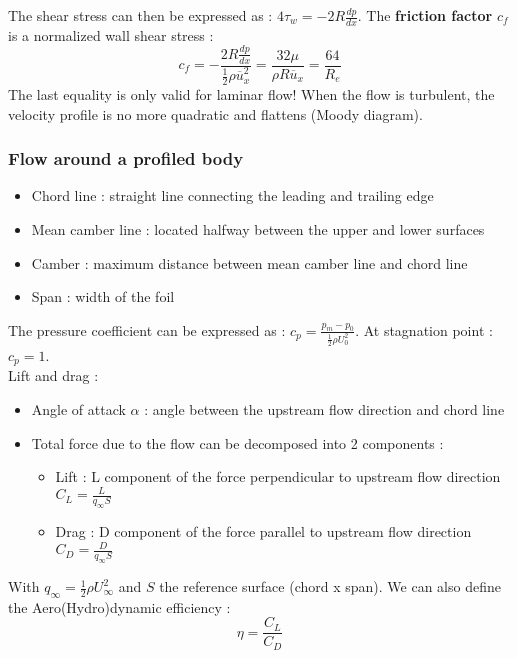 \documentclass[../main.tex]{subfiles}
\begin{document}
The shear stress can then be expressed as : $4\tau_w = -2R \frac{dp}{dx}$. The \textbf{friction factor} $c_f$ is a normalized wall shear stress : \begin{equation}
    c_f = -\frac{2R \frac{dp}{dx}}{\frac{1}{2} \rho \overline{u}_x^2} = \frac{32\mu}{\rho R \overline{u}_x} = \frac{64}{R_e}
\end{equation}
\warning The last equality is only valid for laminar flow! When the flow is turbulent, the velocity profile is no more quadratic and flattens (Moody diagram).

\subsubsection{Flow around a profiled body}
\begin{itemize}
    \item Chord line : straight line connecting the leading and trailing edge
    \item Mean camber line : located halfway between the upper and lower surfaces
    \item Camber : maximum distance between mean camber line and chord line
    \item Span : width of the foil
\end{itemize}

The pressure coefficient can be expressed as : $c_p = \frac{p_m-p_0}{\frac{1}{2}\rho U_0^2}$. At stagnation point : $c_p = 1$. \\
Lift and drag : \begin{itemize}
    \item Angle of attack $\alpha$ : angle between the upstream flow direction and chord line
    \item Total force due to the flow can be decomposed into 2 components : \begin{itemize}
        \item Lift : L component of the force perpendicular to upstream flow direction $C_L = \frac{L}{q_\infty S}$
        \item Drag : D component of the force parallel to upstream flow direction $C_D = \frac{D}{q_\infty S}$
    \end{itemize}
\end{itemize}
With $q_\infty = \frac{1}{2} \rho U_\infty^2$ and $S$ the reference surface (chord x span). We can also define the Aero(Hydro)dynamic efficiency : \begin{equation}
    \eta = \frac{C_L}{C_D}
\end{equation}
\end{document}
